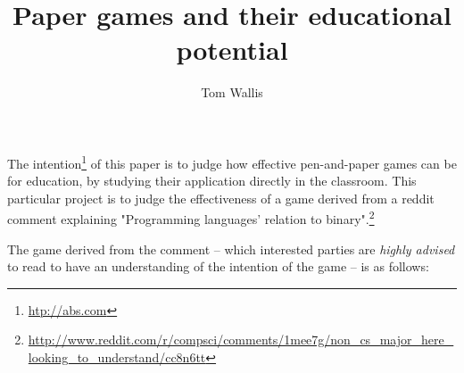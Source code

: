 \documentclass[a4paper]{article}
\title{Paper games and their educational potential}
\author{Tom Wallis}
\begin{document}
\maketitle

The intention\footnote{\url{htp://abs.com}} of this paper is to judge how effective pen-and-paper games can be for education, by studying their application directly in the classroom. 
This particular project is to judge the effectiveness of a game derived from a reddit comment explaining "Programming languages' relation to binary".\footnote{\url{http://www.reddit.com/r/compsci/comments/1mee7g/non_cs_major_here_looking_to_understand/cc8n6tt}}

The game derived from the comment -- which interested parties are \emph{highly advised} to read to have an understanding of the intention of the game -- is as follows: 
\end{document}

